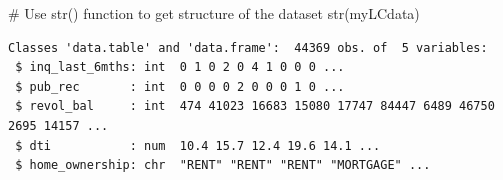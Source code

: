\documentclass[
  letterpaper,
  DIV=11,
  numbers=noendperiod]{scrartcl}
\newenvironment{Shaded}{\begin{snugshade}}{\end{snugshade}}
\newcommand{\CommentTok}[1]{\textcolor[rgb]{0.37,0.37,0.37}{#1}}
\newcommand{\FunctionTok}[1]{\textcolor[rgb]{0.28,0.35,0.67}{#1}}
\newcommand{\NormalTok}[1]{\textcolor[rgb]{0.00,0.23,0.31}{#1}}
\begin{document}
\begin{Shaded}
\begin{Highlighting}[]
\CommentTok{\# Use str() function to get structure of the dataset}
\FunctionTok{str}\NormalTok{(myLCdata)}
\end{Highlighting}
\end{Shaded}

\begin{verbatim}
Classes 'data.table' and 'data.frame':  44369 obs. of  5 variables:
 $ inq_last_6mths: int  0 1 0 2 0 4 1 0 0 0 ...
 $ pub_rec       : int  0 0 0 0 2 0 0 0 1 0 ...
 $ revol_bal     : int  474 41023 16683 15080 17747 84447 6489 46750 2695 14157 ...
 $ dti           : num  10.4 15.7 12.4 19.6 14.1 ...
 $ home_ownership: chr  "RENT" "RENT" "RENT" "MORTGAGE" ...
\end{verbatim}
\end{document}
